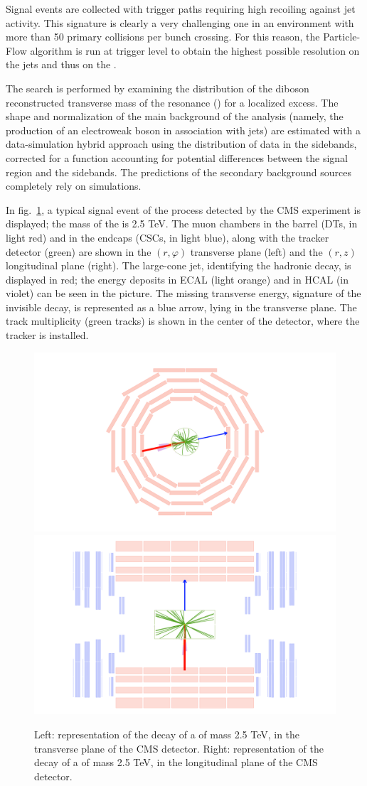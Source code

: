 \noindent Signal events are collected with trigger paths requiring high \met recoiling against jet activity. This signature is clearly a very challenging one in an environment with more than 50 primary collisions per bunch crossing. For this reason, the Particle-Flow algorithm is run at trigger level to obtain the highest possible resolution on the jets and thus on the \met.

\noindent The search is performed by examining the distribution of the diboson reconstructed transverse mass of the resonance \VZ (\mtVZ) for a localized excess. The shape and normalization of the main background of the analysis (namely, the production of an electroweak boson in association with jets) are estimated with a data-simulation hybrid approach using the distribution of data in the sidebands, corrected for a function accounting for potential differences between the signal region and the sidebands. The predictions of the secondary background sources completely rely on simulations.

\noindent In fig.~\ref{fig:event_display}, a typical signal event of the \Wpinv process detected by the CMS experiment is displayed; the mass of the \Wp is 2.5 TeV. The muon chambers in the barrel (DTs, in light red) and in the endcaps (CSCs, in light blue), along with the tracker detector (green) are shown in the $(r, \varphi)$ transverse plane (left) and the $(r, z)$ longitudinal plane (right). The large-cone jet, identifying the \W hadronic decay, is displayed in red; the energy deposits in ECAL (light orange) and in HCAL (in violet) can be seen in the picture. The missing transverse energy, signature of the \Z invisible decay, is represented as a blue arrow, lying in the transverse plane. The track multiplicity (green tracks) is shown in the center of the detector, where the tracker is installed.

\begin{figure}[!htb]
  \centering
    \includegraphics[width=.5\textwidth]{evdisp/Wprime25Tev_rhophi_all.png}%
    \includegraphics[width=.5\textwidth]{evdisp/Wprime25Tev_rhoz_all.png}%

  \caption{Left: representation of the decay of a \Wp of mass 2.5 TeV, in the transverse plane of the CMS detector. Right: representation of the decay of a \Wp of mass 2.5 TeV, in the longitudinal plane of the CMS detector.}
  \label{fig:event_display}
\end{figure}
